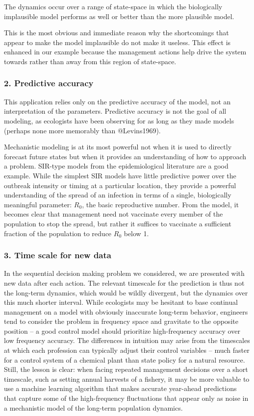 \documentclass[author-year, review]{elsarticle} %
\begin{document}
The dynamics occur over a range of state-space in which the biologically
implausible model performs as well or better than the more plausible
model.

This is the most obvious and immediate reason why the shortcomings that
appear to make the model implausible do not make it useless. This effect
is enhanced in our example because the management actions help drive the
system towards rather than away from this region of state-space.

\subsubsection{2. Predictive accuracy}

This application relies only on the predictive accuracy of the model,
not an interpretation of the parameters. Predictive accuracy is not the
goal of all modeling, as ecologists have been observing for as long as
they made models (perhaps none more memorably than @Levins1969).

Mechanistic modeling is at its most powerful not when it is used to
directly forecast future states but when it provides an understanding of
how to approach a problem. SIR-type models from the epidemiological
literature are a good example. While the simplest SIR models have little
predictive power over the outbreak intensity or timing at a particular
location, they provide a powerful understanding of the spread of an
infection in terms of a single, biologically meaningful parameter:
$R_0$, the basic reproductive number. From the model, it becomes clear
that management need not vaccinate every member of the population to
stop the spread, but rather it suffices to vaccinate a sufficient
fraction of the population to reduce $R_0$ below 1.

\subsubsection{3. Time scale for new data}

In the sequential decision making problem we considered, we are
presented with new data after each action. The relevant timescale for
the prediction is thus not the long-term dynamics, which would be wildly
divergent, but the dynamics over this much shorter interval. While
ecologists may be hesitant to base continual management on a model with
obviously inaccurate long-term behavior, engineers tend to consider the
problem in frequency space and gravitate to the opposite position -- a
good control model should prioritize high-frequency accuracy over low
frequency accuracy. The differences in intuition may arise from the
timescales at which each profession can typically adjust their control
variables -- much faster for a control system of a chemical plant than
state policy for a natural resource. Still, the lesson is clear: when
facing repeated management decisions over a short timescale, such as
setting annual harvests of a fishery, it may be more valuable to use a
machine learning algorithm that makes accurate year-ahead predictions
that capture some of the high-frequency fluctuations that appear only as
noise in a mechanistic model of the long-term population dynamics.
\end{document}
